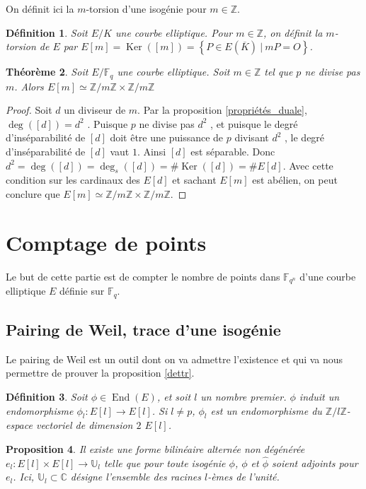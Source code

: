 \documentclass{article}
\theoremstyle{plain}%
\newtheorem{thm}{Théorème}[section]
\newtheorem{prop}[thm]{Proposition}
\newtheorem{deff}[thm]{Définition}
\theoremstyle{definition}%
\newcommand{\F}{\mathbb{F}}
\newcommand{\Z}{\mathbb{Z}}
\newcommand{\h}{\widehat}
\DeclareMathOperator{\End}{End}
\DeclareMathOperator{\Ker}{Ker}
\begin{document}
On définit ici la $m$-torsion d'une isogénie pour $m\in\Z$.

\begin{deff}
  Soit $E/K$ une courbe elliptique. Pour $m\in\Z$, on définit la $m$-torsion de $E$ par $ E[m] = \Ker([m])= \left\{ P\in E(\overline{K}) \ \vert\  mP = O \right\}$.
\end{deff}

\begin{thm}
  \label{structure_torsion}
  Soit $E/\F_q$ une courbe elliptique. Soit $m\in \Z$ tel que $p$ ne divise pas $m$. Alors $E[m] \simeq {\Z}/{m\Z} \times  {\Z}/{m\Z}$
\end{thm}

\begin{proof}
Soit $d$ un diviseur de $m$. 
Par la proposition \ref{propriétés_duale}, $\deg([d]) = d^2$ . Puisque $p$ ne divise pas $d^2$ , et puisque le degré d'inséparabilité de $[d]$ doit être une puissance de $p$ divisant $d^2$ , le degré d'inséparabilité de $[d]$ vaut $1$. Ainsi $[d]$ est séparable. Donc $d^2 = \deg([d]) = \deg_s([d]) = \#\Ker([d]) = \#E[d]$. 
Avec cette condition sur les cardinaux des $E[d]$ et sachant $E[m]$ est abélien, on peut conclure que $E[m] \simeq {\Z}/{m\Z} \times  {\Z}/{m\Z}$.
\end{proof}



\section{Comptage de points}

Le but de cette partie est de compter le nombre de points dans $\F_{q^n}$ d'une courbe elliptique $E$ définie sur $\F_q$.

\subsection{Pairing de Weil, trace d'une isogénie}

Le pairing de Weil est un outil dont on va admettre l'existence et qui va nous permettre de prouver la proposition \ref{dettr}.

\begin{deff}
  Soit $\phi\in \End(E)$, et soit $l$ un nombre premier. $\phi$ induit un endomorphisme $\phi_l : E[l] \to E[l]$. Si $l\neq p$, $\phi_l$ est un endomorphisme du $\Z/l\Z$-espace vectoriel de dimension $2$ $E[l]$. 
\end{deff}

\begin{prop}
  \label{pairing}
  Il existe une forme bilinéaire alternée non dégénérée 
  $e_l : E[l] \times E[l] \to \mathbb{U}_l$ telle que pour toute isogénie $\phi$, $\phi$ et $\h\phi$ soient adjoints pour $e_l$.
  Ici, $\mathbb{U}_l \subset \mathbb{C}$ 
  désigne l'ensemble des racines $l$-èmes de l'unité.
\end{prop}
\end{document}
